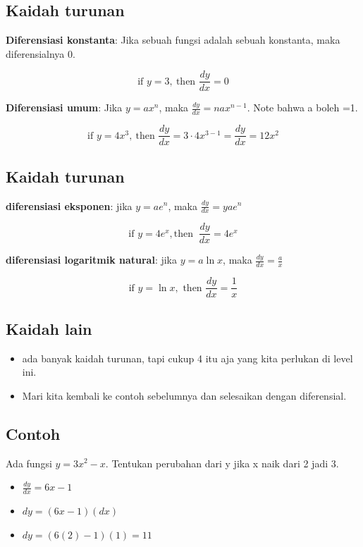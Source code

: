 \documentclass[
  letterpaper,
  DIV=11,
  numbers=noendperiod]{scrartcl}
\begin{document}
\subsection{Kaidah turunan}\label{kaidah-turunan}

\textbf{Diferensiasi konstanta}: Jika sebuah fungsi adalah sebuah
konstanta, maka diferensialnya 0.

\[
\text{if }y=3, \ \text{then } \frac{dy}{dx}=0
\]

\textbf{Diferensiasi umum}: Jika \(y=ax^n\), maka
\(\frac{dy}{dx}=nax^{n-1}\). Note bahwa a boleh =1.

\[
\text{if }y=4x^3, \ \text{then } \frac{dy}{dx}=3\cdot 4x^{3-1}=\frac{dy}{dx}=12x^2
\]

\subsection{Kaidah turunan}\label{kaidah-turunan-1}

\textbf{diferensiasi eksponen}: jika \(y=ae^n\), maka
\(\frac{dy}{dx}=yae^n\)

\[
\text{if } y=4e^x, \text{then } \ \frac{dy}{dx}=4e^x
\]

\textbf{diferensiasi logaritmik natural}: jika \(y=a \ln x\), maka
\(\frac{dy}{dx}=\frac{a}{x}\)

\[
\text{if }y= \ln x, \text{ then } \frac{dy}{dx}=\frac{1}{x}
\]

\subsection{Kaidah lain}\label{kaidah-lain}

\begin{itemize}
\item
  ada banyak kaidah turunan, tapi cukup 4 itu aja yang kita perlukan di
  level ini.
\item
  Mari kita kembali ke contoh sebelumnya dan selesaikan dengan
  diferensial.
\end{itemize}

\subsection{Contoh}\label{contoh-6}

Ada fungsi \(y=3x^2-x\). Tentukan perubahan dari y jika x naik dari 2
jadi 3.

\begin{itemize}
\item
  \(\frac{dy}{dx}=6x-1\)
\item
  \(dy=(6x-1)(dx)\)
\item
  \(dy=(6(2)-1)(1)=11\)
\end{itemize}
\end{document}
